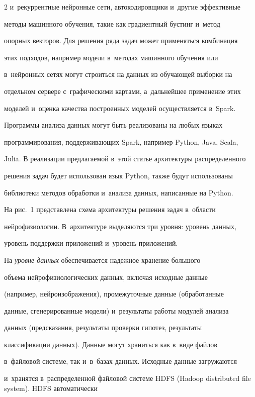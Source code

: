 \begin{multicols}{2}
и~рекуррентные нейронные сети, автокодировщики и~другие эффективные 

методы машинного обучения, такие как градиентный бустинг и~метод 

опорных векторов. Для решения ряда задач может применяться комбинация 

этих подходов, например модели в~методах машинного обучения или 

в~нейронных сетях могут строиться на данных из обучающей выборки на 

отдельном сервере с~графическими картами, а~дальнейшее применение этих 

моделей и~оценка качества построенных моделей осуществляется в~Spark.

    

    Программы анализа данных могут быть реализованы на любых языках 

программирования, поддерживающих Spark, например Python, Java, Scala, 

Julia. В реализации предлагаемой в~этой статье архитектуры распределенного 

решения задач будет использован язык Python, также будут использованы 

библиотеки методов обработки и~анализа данных, написанные на Python.

    

    На рис.~1 представлена схема архитектуры решения задач в~области 

нейрофизиологии. В~архитектуре выделяются три уровня: уровень данных, 

уровень поддержки приложений и~уровень приложений.

    

    На \textit{уровне данных} обеспечивается надежное хранение большого 

объема нейрофизиологических данных, включая исходные данные 

(например, нейро\-изоб\-ра\-же\-ния), промежуточные данные (обработанные 

данные, сгенерированные модели) и~результаты работы модулей анализа 

данных (предсказания, результаты проверки гипотез, результаты 

классификации данных). Данные могут храниться как в~виде файлов 

в~файловой системе, так и~в~базах данных. Исходные данные загружаются 

и~хранятся в~распределенной файловой системе HDFS (Hadoop distributed file system). HDFS автоматически 


\end{multicols}
